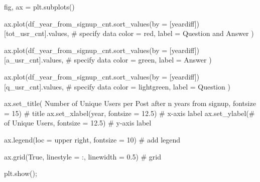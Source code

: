 \documentclass[
  letterpaper,
  DIV=11,
  numbers=noendperiod]{scrartcl}
\newenvironment{Shaded}{\begin{snugshade}}{\end{snugshade}}
\newcommand{\CommentTok}[1]{\textcolor[rgb]{0.37,0.37,0.37}{#1}}
\newcommand{\DecValTok}[1]{\textcolor[rgb]{0.68,0.00,0.00}{#1}}
\newcommand{\FloatTok}[1]{\textcolor[rgb]{0.68,0.00,0.00}{#1}}
\newcommand{\NormalTok}[1]{\textcolor[rgb]{0.00,0.23,0.31}{#1}}
\newcommand{\OperatorTok}[1]{\textcolor[rgb]{0.37,0.37,0.37}{#1}}
\newcommand{\StringTok}[1]{\textcolor[rgb]{0.13,0.47,0.30}{#1}}
\newcommand{\VariableTok}[1]{\textcolor[rgb]{0.07,0.07,0.07}{#1}}
\begin{document}
\begin{Shaded}
\begin{Highlighting}[]
\NormalTok{fig, ax }\OperatorTok{=}\NormalTok{ plt.subplots()}


\NormalTok{ax.plot(df\_year\_from\_signup\_cnt.sort\_values(by }\OperatorTok{=}\NormalTok{ [}\StringTok{\textquotesingle{}yeardiff\textquotesingle{}}\NormalTok{])[}\StringTok{\textquotesingle{}tot\_usr\_cnt\textquotesingle{}}\NormalTok{].values, }\CommentTok{\# specify data}
\NormalTok{        color }\OperatorTok{=} \StringTok{\textquotesingle{}red\textquotesingle{}}\NormalTok{,}
\NormalTok{        label }\OperatorTok{=} \StringTok{\textquotesingle{}Question and Answer\textquotesingle{}}
\NormalTok{) }


\NormalTok{ax.plot(df\_year\_from\_signup\_cnt.sort\_values(by }\OperatorTok{=}\NormalTok{ [}\StringTok{\textquotesingle{}yeardiff\textquotesingle{}}\NormalTok{])[}\StringTok{\textquotesingle{}a\_usr\_cnt\textquotesingle{}}\NormalTok{].values, }\CommentTok{\# specify data}
\NormalTok{        color }\OperatorTok{=} \StringTok{\textquotesingle{}green\textquotesingle{}}\NormalTok{,}
\NormalTok{        label }\OperatorTok{=} \StringTok{\textquotesingle{}Answer\textquotesingle{}}
\NormalTok{)}


\NormalTok{ax.plot(df\_year\_from\_signup\_cnt.sort\_values(by }\OperatorTok{=}\NormalTok{ [}\StringTok{\textquotesingle{}yeardiff\textquotesingle{}}\NormalTok{])[}\StringTok{\textquotesingle{}q\_usr\_cnt\textquotesingle{}}\NormalTok{].values, }\CommentTok{\# specify data}
\NormalTok{        color }\OperatorTok{=} \StringTok{\textquotesingle{}lightgreen\textquotesingle{}}\NormalTok{,}
\NormalTok{        label }\OperatorTok{=} \StringTok{\textquotesingle{}Question\textquotesingle{}}
\NormalTok{) }



\NormalTok{ax.set\_title(}\StringTok{\textquotesingle{} Number of Unique Users per Post after n years from signup\textquotesingle{}}\NormalTok{, fontsize }\OperatorTok{=} \DecValTok{15}\NormalTok{) }\CommentTok{\# title}
\NormalTok{ax.set\_xlabel(}\StringTok{\textquotesingle{}year\textquotesingle{}}\NormalTok{, fontsize }\OperatorTok{=} \FloatTok{12.5}\NormalTok{) }\CommentTok{\# x{-}axis label}
\NormalTok{ax.set\_ylabel(}\StringTok{\textquotesingle{}\# of Unique Users\textquotesingle{}}\NormalTok{, fontsize }\OperatorTok{=} \FloatTok{12.5}\NormalTok{) }\CommentTok{\# y{-}axis label}

\NormalTok{ax.legend(loc }\OperatorTok{=} \StringTok{\textquotesingle{}upper right\textquotesingle{}}\NormalTok{, fontsize }\OperatorTok{=} \DecValTok{10}\NormalTok{) }\CommentTok{\# add legend}

\NormalTok{ax.grid(}\VariableTok{True}\NormalTok{, linestyle }\OperatorTok{=} \StringTok{\textquotesingle{}:\textquotesingle{}}\NormalTok{, linewidth }\OperatorTok{=} \FloatTok{0.5}\NormalTok{) }\CommentTok{\# grid}

\NormalTok{plt.show()}\OperatorTok{;}
\end{Highlighting}
\end{Shaded}
\end{document}
